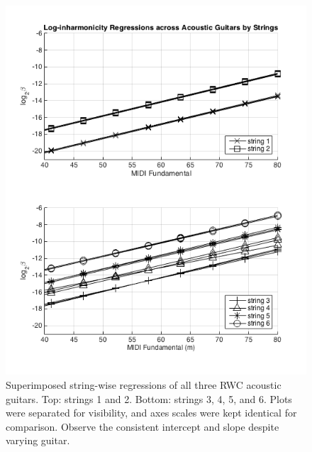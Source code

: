 \documentclass[12pt]{cmuthesis}
\begin{document}
\begin{figure}[!htbp] 
\centering
\includegraphics[scale=0.75]{traj-compare-ag}
\caption{Superimposed string-wise regressions of all three RWC acoustic guitars. Top: strings 1 and 2. Bottom: strings 3, 4, 5, and 6. Plots were separated for visibility, and axes scales were kept identical for comparison. Observe the consistent intercept and slope despite varying guitar.}
\label{fig:ag-traj-comp}
\end{figure}
\end{document}
